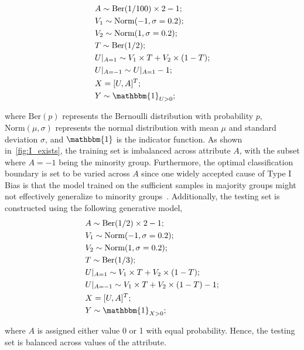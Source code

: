 \begin{align*}
&A \sim \text{Ber}(1/100) \times 2 - 1; \\
&V_1 \sim \text{Norm}(-1,\sigma=0.2); \\
&V_2 \sim \text{Norm}(1,\sigma=0.2); \\
&T \sim \text{Ber}(1/2); \\
&U|_{A=1} \sim V_1 \times T + V_2 \times (1-T); \\
&U|_{A=-1} \sim U|_{A=1} - 1; \\
&X = [U,A]^T; \\
&Y \sim \mathbbm{1}_{U > 0};
\end{align*}

\noindent
where $\text{Ber}(p)$ represents the Bernoulli distribution with probability $p$, $\text{Norm}(\mu, \sigma)$ represents the normal distribution with mean $\mu$ and standard deviation $\sigma$, and $\mathbbm{1}$ is the indicator function. 
As shown in~\cref{fig:I_exists}, the training set is imbalanced across attribute $A$, with the subset where $A=-1$ being the minority group. 
Furthermore, the optimal classification boundary is set to be varied across $A$ since one widely accepted cause of Type I Bias is that the model trained on the sufficient samples in majority groups might not effectively generalize to minority groups~\cite{spurious_correlation_Underrepresentation}. 
Additionally, the testing set is constructed using the following generative model,
\begin{align*}
&A \sim \text{Ber}(1/2) \times 2 - 1; \\
&V_1 \sim \text{Norm}(-1,\sigma=0.2); \\
&V_2 \sim \text{Norm}(1,\sigma=0.2); \\
&T \sim \text{Ber}(1/3); \\
&U|_{A=1} \sim V_1 \times T + V_2 \times (1-T); \\
&U|_{A=-1} \sim V_1 \times T + V_2 \times (1-T) - 1; \\
&X = [U,A]^T; \\
&Y \sim \mathbbm{1}_{X > 0};
\end{align*}

\noindent
where $A$ is assigned either value 0 or 1 with equal probability.
Hence, the testing set is balanced across values of the attribute.



